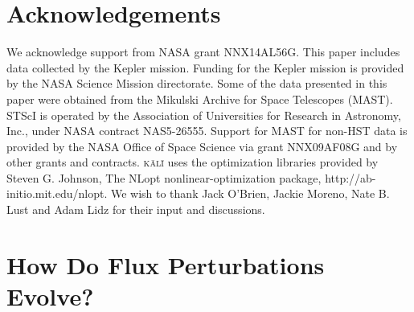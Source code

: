 \documentclass[a4paper,fleqn,usenatbib]{mnras}
\begin{document}
\section*{Acknowledgements}

We acknowledge support from NASA grant NNX14AL56G. This paper includes data collected by the Kepler mission. Funding for the Kepler mission is provided by the NASA Science Mission directorate. Some of the data presented in this paper were obtained from the Mikulski Archive for Space Telescopes (MAST). STScI is operated by the Association of Universities for Research in Astronomy, Inc., under NASA contract NAS5-26555. Support for MAST for non-HST data is provided by the NASA Office of Space Science via grant NNX09AF08G and by other grants and contracts. \textsc{k\={a}l\={i}} uses the optimization libraries provided by Steven G. Johnson, The NLopt nonlinear-optimization package, http://ab-initio.mit.edu/nlopt. We wish to thank Jack O'Brien, Jackie Moreno, Nate B. Lust and Adam Lidz for their input and discussions.











\appendix

\section[Perturbation Evolution]{How Do Flux Perturbations Evolve?}\label{sec:LHS}
\end{document}
